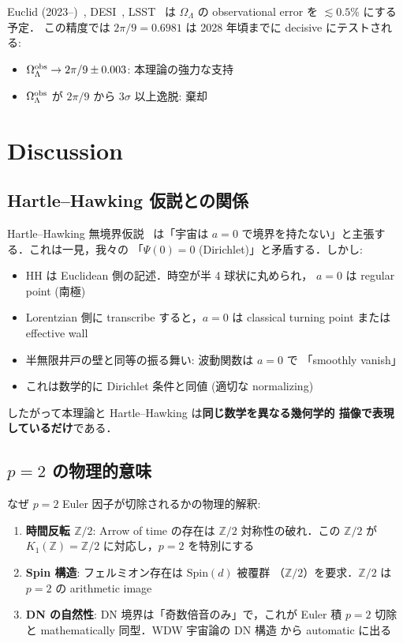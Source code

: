 \documentclass[11pt,a4paper]{article}
\begin{document}
Euclid (2023--)~\cite{Euclid}, DESI~\cite{DESI}, LSST~\cite{LSST} は
$\Omega_\Lambda$ の observational error を $\lesssim 0.5\%$ にする予定．
この精度では $2\pi/9 = 0.6981$ は 2028 年頃までに decisive にテストされる:
\begin{itemize}
\item $\Omega_\Lambda^{\rm obs} \to 2\pi/9 \pm 0.003$: 本理論の強力な支持
\item $\Omega_\Lambda^{\rm obs}$ が $2\pi/9$ から $3\sigma$ 以上逸脱: 棄却
\end{itemize}

\section{Discussion}

\subsection{Hartle--Hawking 仮説との関係}

Hartle--Hawking 無境界仮説~\cite{HartleHawking1983} は「宇宙は
$a=0$ で境界を持たない」と主張する．これは一見，我々の
「$\Psi(0) = 0$ (Dirichlet)」と矛盾する．しかし:
\begin{itemize}
\item HH は Euclidean 側の記述．時空が半 4 球状に丸められ，
$a=0$ は regular point (南極)
\item Lorentzian 側に transcribe すると，$a=0$ は classical turning
point または effective wall
\item 半無限井戸の壁と同等の振る舞い: 波動関数は $a=0$ で
「smoothly vanish」
\item これは数学的に Dirichlet 条件と同値 (適切な normalizing)
\end{itemize}

したがって本理論と Hartle--Hawking は\textbf{同じ数学を異なる幾何学的
描像で表現しているだけ}である．

\subsection{$p=2$ の物理的意味}

なぜ $p=2$ Euler 因子が切除されるかの物理的解釈:

\begin{enumerate}
\item \textbf{時間反転 $\mathbb{Z}/2$}: Arrow of time の存在は
$\mathbb{Z}/2$ 対称性の破れ．この $\mathbb{Z}/2$ が
$K_1(\mathbb{Z}) = \mathbb{Z}/2$ に対応し，$p=2$ を特別にする
\item \textbf{Spin 構造}: フェルミオン存在は $\text{Spin}(d)$ 被覆群
（$\mathbb{Z}/2$）を要求．$\mathbb{Z}/2$ は $p=2$ の arithmetic
image
\item \textbf{DN の自然性}: DN 境界は「奇数倍音のみ」で，これが
Euler 積 $p=2$ 切除と mathematically 同型．WDW 宇宙論の DN 構造
から automatic に出る
\end{enumerate}
\end{document}
